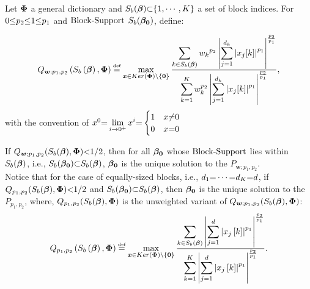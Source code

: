 \begin{tcolorbox}
\begin{theorem}
\label{th:BNSP}
Let $\boldsymbol{\Phi}$  a general dictionary  and $S_b(\boldsymbol{\beta}) {\subset}\{1, \cdots , K\}$ a set of block indices. 
For $0 {\leq} p_2 {\leq} 1 {\leq} p_1$ and $\mathrm{Block\text{{-}}Support}$ $S_b(\boldsymbol{\beta_0})$, define:
\iffalse
\begin{gather*}
\label{eq:BNSP}
Q_{\boldsymbol{w};p_1, p_2}\myparanthese{S_b\myparanthese{\mybeta},\myPhi} \myeq \max_{\boldsymbol{x} \in \myKerMath \backslash\left\{\boldsymbol{0}\right\}} \frac{\displaystyle\sum_{k \in S_b\myparanthese{\mybeta}} \myabs{\frac{\displaystyle\sum_{j=1}^{d_k} \myabs{x_{j}[k]} ^{p_1}}{d_k}} ^{\frac{p_2}{p_1}}}{\displaystyle\sum_{k=1}^{K} \myabs{\frac{\displaystyle\sum_{j=1}^{d_k} \myabs{x_{j}[k]} ^{p_1}}{d_k}} ^{\frac{p_2}{p_1}}},
\end{gather*}
\fi
\begin{gather*}
\label{eq:BNSP}
Q_{\boldsymbol{w};p_1, p_2}\myparanthese{S_b\myparanthese{\mybeta},\myPhi} \myeq \max_{\boldsymbol{x} \in \myKerMath \backslash\left\{\boldsymbol{0}\right\}} \frac{\displaystyle\sum_{k \in S_b\myparanthese{\mybeta}} {\mycolor{w_k}}^{p_2} \myabs{\displaystyle\sum_{j=1}^{d_k} \myabs{x_{j}[k]} ^{p_1}} ^{\frac{p_2}{p_1}}}{\displaystyle\sum_{k=1}^{K} \mycolor{w_k}^{p_2} \myabs{\displaystyle\sum_{j=1}^{d_k} \myabs{x_{j}[k]} ^{p_1}} ^{\frac{p_2}{p_1}}},
\end{gather*}
with the convention of  $x^0 {=} \displaystyle\lim_{i {\to} 0^+} x^i {=}
  \begin{cases}
    1   \quad  x {\neq} 0\\
    0   \quad x {=} 0\\
  \end{cases} $ 
  
If $Q_{\boldsymbol{w};p_1,p_2}(S_b(\boldsymbol{\beta}),\boldsymbol{\Phi}) {<} 1/2$, then for all $\boldsymbol{\beta_0}$ whose $\mathrm{Block\text{{-}}Support}$ lies within $S_b(\boldsymbol{\beta})$, i.e., $S_b(\boldsymbol{\beta_0}) {\subset} S_b(\boldsymbol{\beta})$, $\boldsymbol{\beta_0}$ is the unique solution to the $P_{\boldsymbol{w};p_1,p_2}$.
\\

Notice that for the case of equally-sized blocks, i.e., $d_1 {=} \cdots {=} d_K {=} d$, if $Q_{p_1,p_2}(S_b(\boldsymbol{\beta}),\boldsymbol{\Phi}) {<} 1/2$ and $S_b(\boldsymbol{\beta_0}) {\subset} S_b(\boldsymbol{\beta})$, then $\boldsymbol{\beta_0}$ is the unique solution to the $P_{p_1,p_2}$, where, $Q_{p_1,p_2}(S_b(\boldsymbol{\beta}),\boldsymbol{\Phi})$ is the unweighted variant of $Q_{\boldsymbol{w};p_1,p_2}(S_b(\boldsymbol{\beta}),\boldsymbol{\Phi})$:
\begin{gather*}
Q_{p_1, p_2}\myparanthese{S_b\myparanthese{\mybeta},\myPhi} \myeq \max_{\boldsymbol{x} \in \myKerMath \backslash\left\{\boldsymbol{0}\right\}} \frac{\displaystyle\sum_{k \in S_b\myparanthese{\mybeta}} \myabs{\displaystyle\sum_{j=1}^{d} \myabs{x_{j}\mybracket{k}} ^{p_1}} ^{\frac{p_2}{p_1}}}{\displaystyle\sum_{k=1}^{K} \myabs{\displaystyle\sum_{j=1}^{d} \myabs{x_{j}\mybracket{k}} ^{p_1}} ^{\frac{p_2}{p_1}}}.
\end{gather*}
\end{theorem}
\end{tcolorbox}
